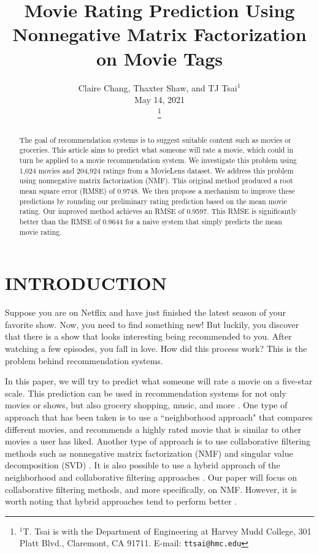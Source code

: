 \documentclass[letterpaper, 10 pt, conference]{ieeeconf}  %
\title{\LARGE \bf
Movie Rating Prediction Using Nonnegative Matrix Factorization on Movie Tags
}
\author{Claire Chang, Thaxter Shaw, and TJ Tsai$^{1}$%
\\ \vspace*{10pt} \normalsize  May 14, 2021

\thanks{$^{1}$T. Tsai is with the Department of Engineering at Harvey Mudd College,
301 Platt Blvd., Claremont, CA 91711. E-mail: {\tt\small ttsai@hmc.edu}}%
}
\begin{document}
\maketitle
\thispagestyle{empty}
\pagestyle{empty}


\begin{abstract}

The goal of recommendation systems is to suggest suitable content such as movies or groceries. This article aims to predict what someone will rate a movie, which could in turn be applied to a movie recommendation system.
We investigate this problem using 1,024 movies and 204,924 ratings from a MovieLens dataset.
We address this problem using nonnegative matrix factorization (NMF). This original method produced a root mean square error (RMSE) of 0.9748. We then propose a mechanism to improve these predictions by rounding our preliminary rating prediction based on the mean movie rating.
Our improved method achieves an RMSE of 0.9597. This RMSE is significantly better than the RMSE of 0.9644 for a naive system that simply predicts the mean movie rating.

\end{abstract}


\medbreak
\section{INTRODUCTION}

Suppose you are on Netflix and have just finished the latest season of your favorite show. Now, you need to find something new! But luckily, you discover that there is a show that looks interesting being recommended to you. After watching a few episodes, you fall in love. How did this process work? This is the problem behind recommendation systems. 

In this paper, we will try to predict what someone will rate a movie on a five-star scale. This prediction can be used in recommendation systems for not only movies or shows, but also grocery shopping, music, and more \cite{recsys}. One type of approach that has been taken is to use a ``neighborhood approach" that compares different movies, and recommends a highly rated movie that is similar to other movies a user has liked. 
Another type of approach is to use collaborative filtering methods such as nonnegative matrix factorization (NMF) and singular value decomposition (SVD) \cite{cf}. 
It is also possible to use a hybrid approach of the neighborhood and collaborative filtering approaches \cite{hybrid}. Our paper will focus on collaborative filtering methods, and more specifically, on NMF. However, it is worth noting that hybrid approaches tend to perform better \cite{netflix}.
\end{document}
